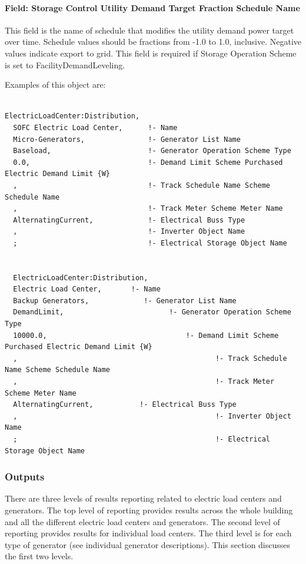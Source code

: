 \paragraph{Field: Storage Control Utility Demand Target Fraction Schedule Name}\label{field-storage-control-utility-demand-target-fraction-schedule-name}

This field is the name of schedule that modifies the utility demand power target over time. Schedule values should be fractions from -1.0 to 1.0, inclusive. Negative values indicate export to grid. This field is required if Storage Operation Scheme is set to FacilityDemandLeveling.

Examples of this object are:

\begin{lstlisting}

ElectricLoadCenter:Distribution,
  SOFC Electric Load Center,      !- Name
  Micro-Generators,               !- Generator List Name
  Baseload,                       !- Generator Operation Scheme Type
  0.0,                            !- Demand Limit Scheme Purchased Electric Demand Limit {W}
  ,                               !- Track Schedule Name Scheme Schedule Name
  ,                               !- Track Meter Scheme Meter Name
  AlternatingCurrent,             !- Electrical Buss Type
  ,                               !- Inverter Object Name
  ;                               !- Electrical Storage Object Name


  ElectricLoadCenter:Distribution,
  Electric Load Center,       !- Name
  Backup Generators,             !- Generator List Name
  DemandLimit,                         !- Generator Operation Scheme Type
  10000.0,                                 !- Demand Limit Scheme Purchased Electric Demand Limit {W}
  ,                                               !- Track Schedule Name Scheme Schedule Name
  ,                                               !- Track Meter Scheme Meter Name
  AlternatingCurrent,           !- Electrical Buss Type
  ,                                               !- Inverter Object Name
  ;                                               !- Electrical Storage Object Name
\end{lstlisting}

\subsubsection{Outputs}\label{outputs-1-008}

There are three levels of results reporting related to electric load centers and generators. The top level of reporting provides results across the whole building and all the different electric load centers and generators. The second level of reporting provides results for individual load centers. The third level is for each type of generator (see individual generator descriptions). This section discusses the first two levels.

